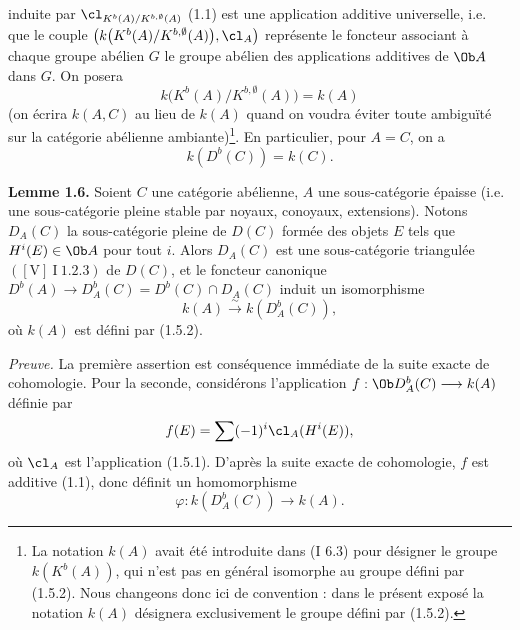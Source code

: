 induite par \(\cl_{K^b(A)/K^{b,\emptyset}(A)}\) (1.1) est une application additive universelle, i.e. que le couple \(\left(k\bigl(K^b(A)/K^{b,\emptyset}(A)\bigr),\cl_A\right)\) représente le foncteur associant à chaque groupe abélien \(G\) le groupe abélien des applications additives de \(\Ob A\) dans \(G\). On posera
\begin{equation}\tag{1.5.2}
 k\bigl(K^b(A)/K^{b,\emptyset}(A)\bigr)=k(A)
\end{equation}
(on écrira \(k(A,C)\) au lieu de \(k(A)\) quand on voudra éviter toute ambiguïté sur la catégorie abélienne ambiante)\footnote{La notation \(k(A)\) avait été introduite dans (I 6.3) pour désigner le groupe \(k(K^b(A))\), qui n'est pas en général isomorphe au groupe défini par (1.5.2). Nous changeons donc ici de convention : dans le présent exposé la notation \(k(A)\) désignera exclusivement le groupe défini par (1.5.2).}.
En particulier, pour \(A=C\), on a
\begin{equation}\tag{1.5.3}
 k(D^b(C))=k(C).
\end{equation}

\textbf{Lemme 1.6.} Soient \(C\) une catégorie abélienne, \(A\) une sous-catégorie épaisse (i.e. une sous-catégorie pleine stable par noyaux, conoyaux, extensions). Notons \(D_A(C)\) la sous-catégorie pleine de \(D(C)\) formée des objets \(E\) tels que \(H^i(E)\in\Ob A\) pour tout \(i\). Alors \(D_A(C)\) est une sous-catégorie triangulée \(([\mathrm V]\ \mathrm I\ 1.2.3)\) de \(D(C)\), et le foncteur canonique \(D^b(A)\longrightarrow D_A^b(C)=D^b(C)\cap D_A(C)\) induit un isomorphisme
\[
 k(A)\xrightarrow{\sim} k(D_A^b(C)),
\]
où \(k(A)\) est défini par (1.5.2).

\emph{Preuve.} La première assertion est conséquence immédiate de la suite exacte de cohomologie. Pour la seconde, considérons l'application \(f:\Ob D_A^b(C)\longrightarrow k(A)\) définie par
\[
 f(E)=\sum(-1)^i\cl_A(H^i(E)),
\]
où \(\cl_A\) est l'application (1.5.1). D'après la suite exacte de cohomologie, \(f\) est additive (1.1), donc définit un homomorphisme
\[
 \varphi:k(D_A^b(C))\longrightarrow k(A).
\]
